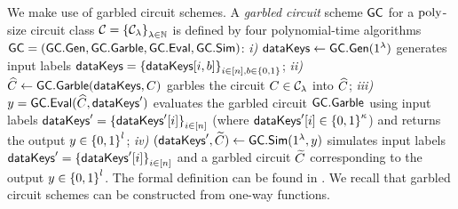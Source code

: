 We make use of garbled circuit schemes.
A \emph{garbled circuit} scheme $\mathsf{GC}$ for a $\text{poly}$-size circuit class $\mathcal{C} = {\{\mathcal{C}_\lambda\}}_{\lambda \in
  \mathbb{N}}$ is defined by four polynomial-time algorithms $\mathsf{GC}=(\mathsf{GC.Gen},\mathsf{GC.Garble},\mathsf{GC.Eval},\allowbreak\mathsf{GC.Sim})$:
\textit{i)} $\mathsf{dataKeys} \gets \mathsf{GC.Gen}(1^\lambda)$
generates input labels $\mathsf{dataKeys} = {\{\mathsf{dataKeys}[i, b]\}}_{i \in
  [n], b \in {\{0,1\}}}$;
\textit{ii)}
$\widehat{C} \gets \mathsf{GC.Garble}(\mathsf{dataKeys}, C)$
garbles the circuit $C \in \mathcal{C}_\lambda$
into $\widehat{C}$;
\textit{iii)} $y = \mathsf{GC.Eval}(\widehat{C}, \mathsf{dataKeys}')$  evaluates the
garbled circuit $\mathsf{GC.Garble}$ using input labels
$\mathsf{dataKeys}' = {\{\mathsf{dataKeys}'[i]\}}_{i \in [n]}$ (where $\mathsf{dataKeys}'[i] \in {\{0,1\}}^\kappa$)
and returns the output $y \in {\{0,1\}}^l$;
\textit{iv)} $(\mathsf{dataKeys}', \widetilde{C}) \gets \mathsf{GC.Sim}(1^\lambda,
    y)$
     simulates  input labels $\mathsf{dataKeys}' = {\{\mathsf{dataKeys}'[i]\}}_{i \in [n]}$ and
    a garbled circuit $\widetilde{C}$ corresponding to the output $y \in {\{0,1\}}^l$.
The formal definition can be found in \appref{}.
We recall that garbled circuit schemes can be constructed from one-way
functions.


